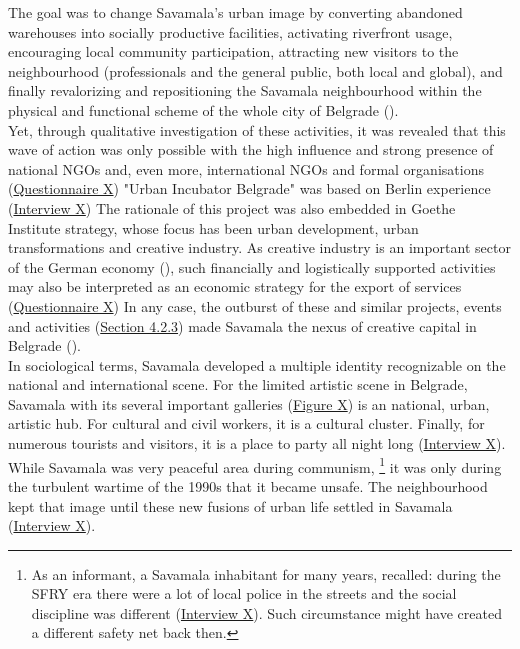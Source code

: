 \documentclass[11pt]{report}
\begin{document}
{{{{The goal was to change Savamala's urban image by converting  abandoned warehouses into socially productive facilities, activating riverfront usage, encouraging local community participation, attracting new visitors to the neighbourhood (professionals and the general public, both local and global), and finally revalorizing and repositioning the Savamala neighbourhood within the physical and functional scheme of the whole city of Belgrade (\href{Cvetinovic}{\citealt{cvetinovic_engine_2013}}).
\\

Yet, through qualitative investigation of these activities, it was revealed that this wave of action was only possible with the high influence and strong presence of national NGOs and, even more, international NGOs and formal organisations 
(\href{Questionnaire Experts Savamala}{Questionnaire X}) 
"Urban Incubator Belgrade" was based on Berlin experience
(\href{InterviewX}{Interview X})
The rationale of this project was also embedded in Goethe Institute strategy, whose focus has been urban development, urban transformations and creative industry. As creative industry is an important sector of the German economy
(\href{Lanz}{\citealt{lanz_cities_2012}}),
such financially and logistically supported activities may also be interpreted as an economic strategy for the export of services (\href{Questionnaire Experts Savamala}{Questionnaire X})
In any case, the outburst of these and similar projects, events and activities (\href{Section 4.2.3}{Section 4.2.3}) made Savamala the nexus of creative capital in Belgrade (\href{B92}{\citealt{b92_savamala_2015}}). %
\\

In sociological terms, Savamala developed a multiple identity recognizable on the national and international scene. For the limited artistic scene in Belgrade, Savamala with its  several important galleries (\href{Figure X}{Figure X})
is an national, urban, artistic hub.
For cultural and civil workers, it is a cultural cluster.
Finally, for numerous tourists and visitors, it is a place to party all night long (\href{InterviewX}{Interview X}).
\\

While Savamala was very peaceful area during communism,
\footnote{As an informant, a Savamala inhabitant for many years, recalled: during the SFRY era there were a lot of local police in the streets and the social discipline was different
(\href{InterviewX}{Interview X}).
Such circumstance might have created a different safety net back then.}
it was only during the turbulent wartime of the 1990s that it became unsafe.
The neighbourhood kept that image until these new fusions of urban life settled in Savamala (\href{InterviewX}{Interview X}).
\\

}}}}
\end{document}
